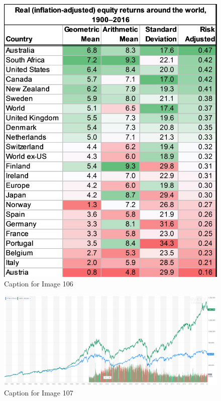 \documentclass{article}
\begin{document}
\begin{figure}[!htb]
    \centering
    \includegraphics[width=\textwidth]{imgs/106.png}
    \caption{Caption for Image 106}
\end{figure}

\vspace{10pt}

\begin{figure}[!htb]
    \centering
    \includegraphics[width=\textwidth]{imgs/107.png}
    \caption{Caption for Image 107}
\end{figure}
\end{document}
